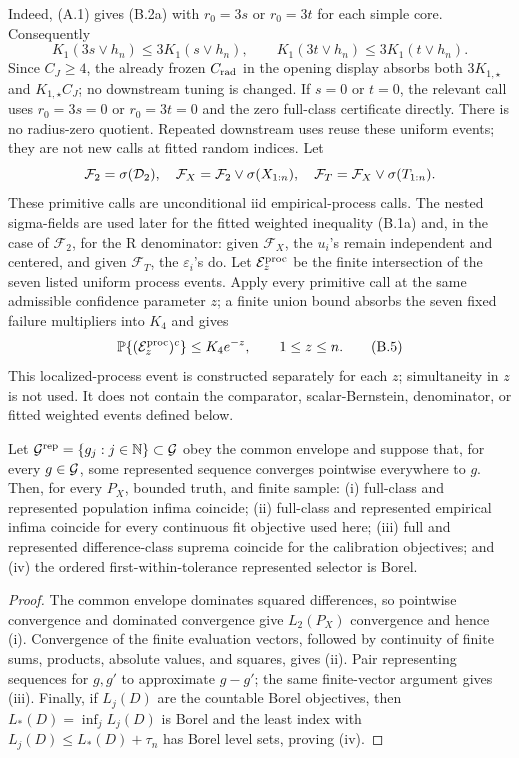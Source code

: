 Indeed, (A.1) gives (B.2a) with \(r_0=3s\) or \(r_0=3t\)
for each simple core.  Consequently
\[
 K_1(3s\vee h_n)\le3K_1(s\vee h_n),\qquad
 K_1(3t\vee h_n)\le3K_1(t\vee h_n).
\]
Since \(C_J\ge4\), the already frozen \(C_{\rm rad}\) in the opening
display absorbs both \(3K_{1,\star}\) and \(K_{1,\star}C_J\); no downstream
tuning is changed.
If \(s=0\) or \(t=0\), the relevant call uses \(r_0=3s=0\) or
\(r_0=3t=0\) and the zero full-class certificate directly.  There is no radius-zero quotient.
Repeated downstream uses reuse these uniform events; they are not new calls
at fitted random indices.  Let
\[
 \mathcal F_2=\sigma(\mathcal D_2),\quad
 \mathcal F_X=\mathcal F_2\vee\sigma(X_{1:n}),\quad
\mathcal F_T=\mathcal F_X\vee\sigma(T_{1:n}).
\]
These primitive calls are unconditional iid empirical-process calls.  The
nested sigma-fields are used later for the fitted weighted inequality
(B.1a) and, in the case of \(\mathcal F_2\), for the R denominator:
given \(\mathcal F_X\), the \(u_i\)'s remain independent and centered, and
given \(\mathcal F_T\), the \(\varepsilon_i\)'s do.  Let
\(\mathcal E_z^{\rm proc}\) be the finite intersection of the seven listed
uniform process events.  Apply every primitive call at the same admissible
confidence parameter \(z\); a finite union bound absorbs the seven fixed
failure multipliers into \(K_4\) and gives
\begin{equation}
 \mathbb P\{(\mathcal E_z^{\rm proc})^c\}\le K_4e^{-z},
 \qquad 1\le z\le n.
 \tag{B.5}
\end{equation}
This localized-process event is constructed separately for each \(z\);
simultaneity in \(z\) is not used.  It does not contain the comparator,
scalar-Bernstein, denominator, or fitted weighted events defined below.

\begin{lemma}
\label{lem:sequential-density-transfer}
Let \(\mathcal G^{\rm rep}=\{g_j:j\in\mathbb N\}\subset\mathcal G\) obey the common
envelope and suppose that, for every \(g\in\mathcal G\), some represented sequence
converges pointwise everywhere to \(g\).  Then, for every \(P_X\), bounded
truth, and finite sample: (i) full-class and represented population infima
coincide; (ii) full-class and represented empirical infima coincide for every
continuous fit objective used here; (iii) full and represented
difference-class suprema coincide for the calibration objectives; and (iv)
the ordered first-within-tolerance represented selector is Borel.
\end{lemma}
\begin{proof}
The common envelope dominates squared differences, so pointwise convergence
and dominated convergence give \(L_2(P_X)\) convergence and hence (i).
Convergence of the finite evaluation vectors, followed by continuity of
finite sums, products, absolute values, and squares, gives (ii).  Pair
representing sequences for \(g,g'\) to approximate \(g-g'\); the same
finite-vector argument gives (iii).  Finally, if \(L_j(D)\) are the countable
Borel objectives, then \(L_*(D)=\inf_jL_j(D)\) is Borel and the least index
with \(L_j(D)\le L_*(D)+\tau_n\) has Borel level sets, proving (iv).
\end{proof}

